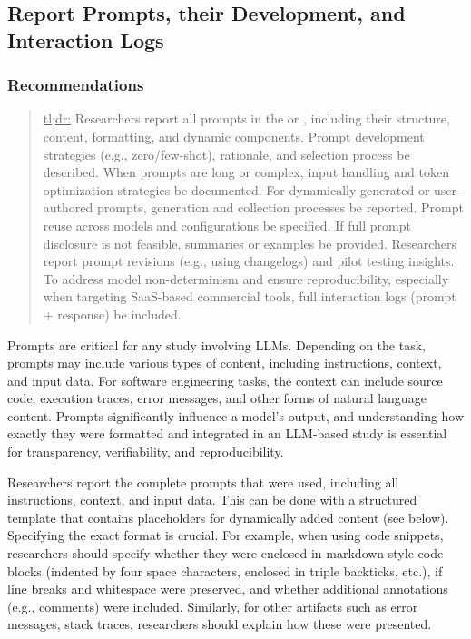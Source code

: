 



\subsection{Report Prompts, their Development, and Interaction Logs}


\subsubsection{Recommendations}

\begin{quote}
\underline{tl;dr:} Researchers \must report all prompts in the \paper or \supplementarymaterial, including their structure, content, formatting, and dynamic components. Prompt development strategies (e.g., zero/few-shot), rationale, and selection process \must be described. When prompts are long or complex, input handling and token optimization strategies \must be documented. For dynamically generated or user-authored prompts, generation and collection processes \must be reported. Prompt reuse across models and configurations \must be specified. If full prompt disclosure is not feasible, summaries or examples \should be provided. Researchers \should report prompt revisions (e.g., using changelogs) and pilot testing insights. To address model non-determinism and ensure reproducibility, especially when targeting SaaS-based commercial tools, full interaction logs (prompt + response) \should be included.
\end{quote}

Prompts are critical for any study involving LLMs.
Depending on the task, prompts may include various \href{https://www.promptingguide.ai/introduction/elements}{types of content}, including instructions, context, and input data.
For software engineering tasks, the context can include source code, execution traces, error messages, and other forms of natural language content.
Prompts significantly influence a model’s output, and understanding how exactly they were formatted and integrated in an LLM-based study is essential for transparency, verifiability, and reproducibility.

Researchers \must report the complete prompts that were used, including all instructions, context, and input data.
This can be done with a structured template that contains placeholders for dynamically added content (see below).
Specifying the exact format is crucial.
For example, when using code snippets, researchers should specify whether they were enclosed in markdown-style code blocks (indented by four space characters, enclosed in triple backticks, etc.), if line breaks and whitespace were preserved, and whether additional annotations (e.g., comments) were included.
Similarly, for other artifacts such as error messages, stack traces, researchers should explain how these were presented.

